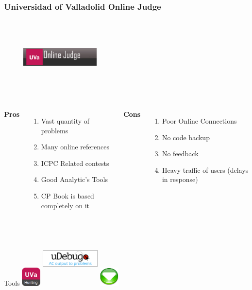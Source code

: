 \documentclass{beamer}
\begin{document}

\begin{frame}
	\frametitle{Universidad of Valladolid Online Judge}
	\begin{figure}[t]
		\href{https://uva.onlinejudge.org/}{\includegraphics[width=4cm,height=4cm,keepaspectratio]{images/judges/uva}}
	\end{figure}
	
	\begin{columns}[c] %
		\textbf{Pros}
		\begin{enumerate}
			\item Vast quantity of problems 
			\item Many online references 
			\item ICPC Related contests
			\item Good Analytic's Tools 
			\item CP Book is based completely on it
		\end{enumerate}
		\textbf{Cons}
		\begin{enumerate}
			\item Poor Online Connections
			\item No code backup
			\item No feedback
			\item Heavy traffic of users (delays in response)
		\end{enumerate}
	\end{columns}
	\begin{block}{Tools}
	\center
	\href{http://uhunt.felix-halim.net/} {\includegraphics[width=1cm,height=1cm,keepaspectratio]{images/tools/uvahunting}}
	\href{https://www.udebug.com/}	{\includegraphics[width=3cm,height=3cm,keepaspectratio]{images/tools/udebug}}
	\href{http://uvatoolkit.com/problemssolve.php}{\includegraphics[width=1cm,height=1cm,keepaspectratio]{images/tools/uvatoolkit}}
	\end{block}


\end{frame}
\end{document}
